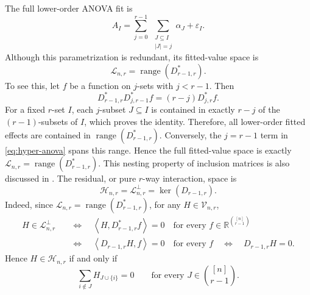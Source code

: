 \documentclass[11pt]{article}
\theoremstyle{plain}
\theoremstyle{definition}
\theoremstyle{remark}
\newcommand{\R}{\mathbb R}
\newcommand{\range}{\operatorname{range}}
\newcommand{\cH}{\mathcal H}
\newcommand{\cL}{\mathcal L}
\newcommand{\cV}{\mathcal V}
\newcommand{\inner}[2]{\left\langle #1,#2\right\rangle}
\begin{document}
The full lower-order ANOVA fit is
\begin{equation}\label{eq:hyper-anova}
 A_I
 =\sum_{j=0}^{r-1}\ \sum_{\substack{J\subseteq I\\|J|=j}}
   \alpha_J+\varepsilon_I.
\end{equation}
Although this parametrization is redundant, its fitted-value space is
  \begin{equation*}
 \cL_{n,r}=\range(D_{r-1,r}^\ast).
\end{equation*}
To see this, let $f$ be a function on $j$-sets with $j<r-1$.  Then
  \begin{equation*}
 D_{r-1,r}^\ast D_{j,r-1}^\ast f
 =(r-j)D_{j,r}^\ast f.
\end{equation*}
For a fixed $r$-set $I$, each $j$-subset $J\subseteq I$ is contained in
exactly $r-j$ of the $(r-1)$-subsets of $I$, which proves the identity.
Therefore, all lower-order fitted effects are contained in
$\range(D_{r-1,r}^\ast)$.  Conversely, the $j=r-1$ term in
\eqref{eq:hyper-anova} spans this range.  Hence the full fitted-value space is
exactly $\cL_{n,r}=\range(D_{r-1,r}^\ast)$.  This nesting property of inclusion
matrices is also discussed in \citet{Gottlieb1966}.  The residual, or pure
$r$-way interaction, space is
  \[
 \cH_{n,r}=\cL_{n,r}^{\perp}=\ker(D_{r-1,r}).
\]
Indeed, since $\cL_{n,r}=\range(D_{r-1,r}^{\ast})$, for any
$H\in\cV_{n,r}$,
\[
\begin{aligned}
 H\in\cL_{n,r}^{\perp}
 &\quad\Longleftrightarrow\quad
 \inner{H}{D_{r-1,r}^{\ast}f}=0
 \quad\text{for every }f\in\R^{\binom{[n]}{r-1}}\\
 &\quad\Longleftrightarrow\quad
 \inner{D_{r-1,r}H}{f}=0
 \quad\text{for every }f
 \quad\Longleftrightarrow\quad
 D_{r-1,r}H=0.
\end{aligned}
\]
Hence $H\in\cH_{n,r}$ if and only if
  \[
 \sum_{i\notin J}H_{J\cup\{i\}}=0
 \qquad\text{for every }J\in\binom{[n]}{r-1}.
\]
\end{document}
